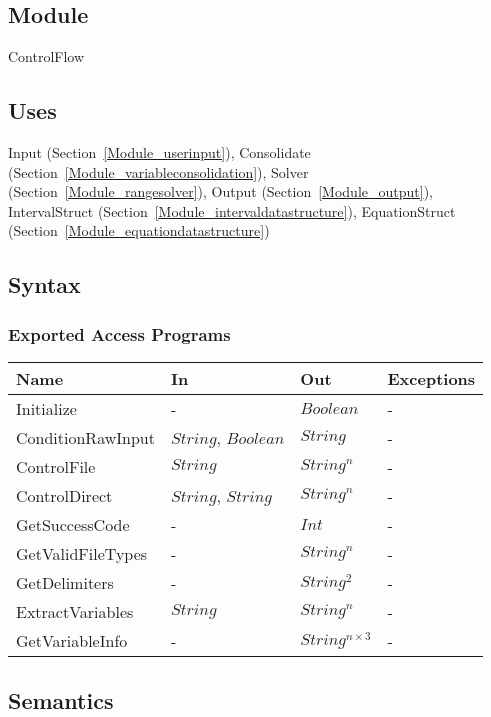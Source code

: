 \documentclass[12pt, titlepage]{article}
\begin{document}
\subsection{Module}

ControlFlow

\subsection{Uses}

Input (Section~\ref{Module_userinput}), Consolidate 
(Section~\ref{Module_variableconsolidation}), Solver 
(Section~\ref{Module_rangesolver}), Output (Section~\ref{Module_output}),
IntervalStruct (Section~\ref{Module_intervaldatastructure}), EquationStruct 
(Section~\ref{Module_equationdatastructure})

\subsection{Syntax}

\subsubsection{Exported Access Programs}

\begin{center}
\begin{tabular}{p{3.2cm} p{3cm} p{3cm} p{5cm}}
\hline
\textbf{Name} & \textbf{In} & \textbf{Out} & \textbf{Exceptions} \\
\hline
Initialize & - & $Boolean$ & - \\
ConditionRawInput & $String$, $Boolean$ & $String$ & - \\
ControlFile & $String$ & $String^n$ & - \\
ControlDirect & $String$, $String$ & $String^n$ & - \\
GetSuccessCode & - & $Int$ & - \\
GetValidFileTypes & - & $String^n$ & - \\
GetDelimiters & - & $String^2$ & - \\
ExtractVariables& $String$ & $String^n$ & - \\
GetVariableInfo & - & $String^{n \times 3}$ & - \\
\hline
\end{tabular}
\end{center}

\subsection{Semantics}
\end{document}
